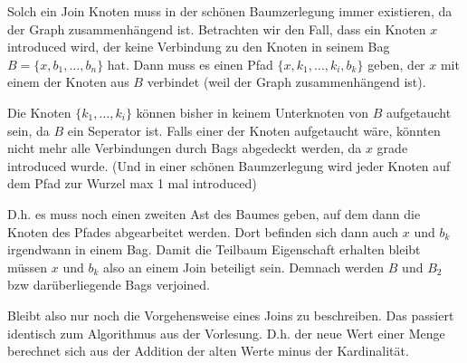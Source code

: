 Solch ein Join Knoten muss in der schönen Baumzerlegung immer existieren, da der Graph zusammenhängend ist.
Betrachten wir den Fall, dass ein Knoten $x$ introduced wird, der keine Verbindung zu den Knoten in seinem Bag $B = \{x, b_1, \dots , b_n\}$ hat.
Dann muss es einen Pfad $\{x, k_1, \dots, k_i, b_k\}$ geben, der $x$ mit einem der Knoten aus $B$ verbindet (weil der Graph zusammenhängend ist).

Die Knoten $\{k_1, \dots, k_i\}$ können bisher in keinem Unterknoten von $B$ aufgetaucht sein, da $B$ ein Seperator ist. Falls einer der Knoten aufgetaucht wäre, könnten nicht mehr alle Verbindungen durch Bags abgedeckt werden, da $x$ grade introduced wurde. (Und in einer schönen Baumzerlegung wird jeder Knoten auf dem Pfad zur Wurzel max 1 mal introduced)

D.h. es muss noch einen zweiten Ast des Baumes geben, auf dem dann die Knoten des Pfades abgearbeitet werden. Dort befinden sich dann auch $x$ und $b_k$ irgendwann in einem Bag. Damit die Teilbaum Eigenschaft erhalten bleibt müssen $x$ und $b_k$ also an einem Join beteiligt sein. Demnach werden $B$ und $B_2$ bzw darüberliegende Bags verjoined.

Bleibt also nur noch die Vorgehensweise eines Joins zu beschreiben. Das passiert identisch zum Algorithmus aus der Vorlesung.
D.h. der neue Wert einer Menge berechnet sich aus der Addition der alten Werte minus der Kardinalität.


